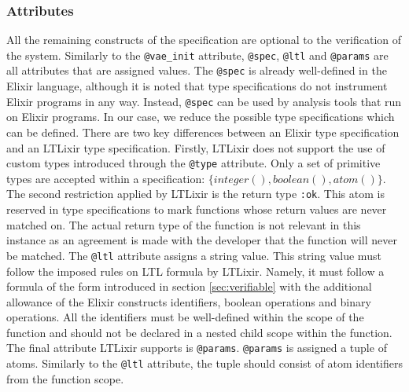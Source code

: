 \subsubsection{Attributes}
All the remaining constructs of the specification are optional to the verification of the system. Similarly to the \texttt{@vae\_init} attribute, \texttt{@spec}, \texttt{@ltl} and \texttt{@params} are all attributes that are assigned values. The \texttt{@spec} is already well-defined in the Elixir language, although it is noted that type specifications do not instrument Elixir programs in any way. Instead, \texttt{@spec} can be used by analysis tools that run on Elixir programs. In our case, we reduce the possible type specifications which can be defined. There are two key differences between an Elixir type specification and an LTLixir type specification. Firstly, LTLixir does not support the use of custom types introduced through the \texttt{@type} attribute. Only a set of primitive types are accepted within a specification: $\{integer(), boolean(), atom()\}$. The second restriction applied by LTLixir is the return type \texttt{:ok}. This atom is reserved in type specifications to mark functions whose return values are never matched on. The actual return type of the function is not relevant in this instance as an agreement is made with the developer that the function will never be matched. The \texttt{@ltl} attribute assigns a string value. This string value must follow the imposed rules on LTL formula by LTLixir. Namely, it must follow a formula of the form introduced in section \ref{sec:verifiable} with the additional allowance of the Elixir constructs identifiers, boolean operations and binary operations. All the identifiers must be well-defined within the scope of the function and should not be declared in a nested child scope within the function. The final attribute LTLixir supports is \texttt{@params}. \texttt{@params} is assigned a tuple of atoms. Similarly to the \texttt{@ltl} attribute, the tuple should consist of atom identifiers from the function scope.
\par
